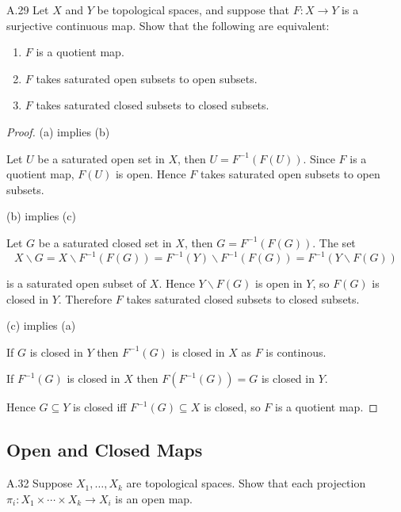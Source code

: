 \begin{exercise}{A.29}
    Let \( X \) and \( Y \) be topological spaces, and suppose that \( F: X \to Y \) is a surjective continuous map. Show that the following are equivalent:
    \begin{enumerate}[itemsep=0pt,label={(\alph*)}]
        \item \( F \) is a quotient map.
        \item \( F \) takes saturated open subsets to open subsets.
        \item \( F \) takes saturated closed subsets to closed subsets.
    \end{enumerate}
\end{exercise}

\begin{proof}
    (a) implies (b)

    Let \( U \) be a saturated open set in \( X \), then \( U = F^{-1}(F(U)) \). Since \( F \) is a quotient map, \( F(U) \) is open. Hence \( F \) takes saturated open subsets to open subsets.

    (b) implies (c)

    Let \( G \) be a saturated closed set in \( X \), then \( G = F^{-1}(F(G)) \). The set
    \[
        X\smallsetminus G = X \smallsetminus F^{-1}(F(G)) = F^{-1}(Y) \smallsetminus F^{-1}(F(G)) = F^{-1}(Y \smallsetminus F(G))
    \]

    is a saturated open subset of \( X \). Hence \( Y \smallsetminus F(G) \) is open in \( Y \), so \( F(G) \) is closed in \( Y \). Therefore \( F \) takes saturated closed subsets to closed subsets.

    (c) implies (a)

    If \( G \) is closed in \( Y \) then \( F^{-1}(G) \) is closed in \( X \) as \( F \) is continous.

    If \( F^{-1}(G) \) is closed in \( X \) then \( F(F^{-1}(G)) = G \) is closed in \( Y \).

    Hence \( G \subseteq Y \) is closed iff \( F^{-1}(G) \subseteq X \) is closed, so \( F \) is a quotient map.
\end{proof}

\subsection{Open and Closed Maps}

\begin{exercise}{A.32}
    Suppose \(X_{1}, \dots, X_{k}\) are topological spaces. Show that each projection \(\pi_{i}\colon X_{1} \times \cdots \times X_{k} \to X_{i}\) is an open map.
\end{exercise}

